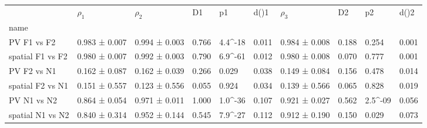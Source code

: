 \begin{tabular}{llllllllll}
\toprule
{} &       $\rho_1$ &       $\rho_2$ &     D1 &                  p1 &   d()1 &       $\rho_3$ &     D2 &                  p2 &   d()2 \\
name             &                &                &        &                     &        &                &        &                     &        \\
\midrule
PV F1 vs F2      &  0.983 ± 0.007 &  0.994 ± 0.003 &  0.766 &  4.4\times 10^{-18} &  0.011 &  0.984 ± 0.008 &  0.188 &               0.254 &  0.001 \\
spatial F1 vs F2 &  0.980 ± 0.007 &  0.992 ± 0.003 &  0.790 &  6.9\times 10^{-61} &  0.012 &  0.980 ± 0.008 &  0.070 &               0.777 &  0.001 \\
PV F2 vs N1      &  0.162 ± 0.087 &  0.162 ± 0.039 &  0.266 &               0.029 &  0.038 &  0.149 ± 0.084 &  0.156 &               0.478 &  0.014 \\
spatial F2 vs N1 &  0.151 ± 0.557 &  0.123 ± 0.556 &  0.055 &               0.924 &  0.034 &  0.139 ± 0.566 &  0.065 &               0.828 &  0.019 \\
PV N1 vs N2      &  0.864 ± 0.054 &  0.971 ± 0.011 &  1.000 &  1.0\times 10^{-36} &  0.107 &  0.921 ± 0.027 &  0.562 &  2.5\times 10^{-09} &  0.056 \\
spatial N1 vs N2 &  0.840 ± 0.314 &  0.952 ± 0.144 &  0.545 &  7.9\times 10^{-27} &  0.112 &  0.912 ± 0.190 &  0.150 &               0.029 &  0.073 \\
\bottomrule
\end{tabular}
